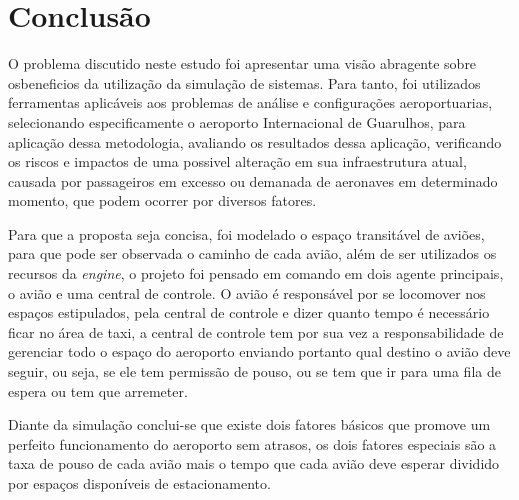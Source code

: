 \documentclass[12pt]{article}
\begin{document}
\section{Conclusão}

O problema discutido neste estudo foi apresentar uma visão abragente 
sobre osbeneficios da utilização da simulação de sistemas. Para tanto, foi 
utilizados ferramentas aplicáveis aos problemas de análise e configurações 
aeroportuarias, selecionando especificamente o aeroporto Internacional de
Guarulhos, para aplicação dessa metodologia, avaliando os resultados dessa
aplicação, verificando os riscos e impactos de uma possivel alteração em
sua infraestrutura atual, causada por passageiros em excesso ou demanada de 
aeronaves em determinado momento, que podem ocorrer por diversos fatores.

Para que a proposta seja concisa, foi modelado o espaço transitável  de aviões, 
para que pode ser observada o caminho de cada avião, além de ser utilizados os
recursos da \textit{engine}, o projeto foi pensado em comando em dois agente principais,
o avião e uma central de controle. O avião é responsável por se locomover nos espaços estipulados, 
pela central de controle e dizer quanto tempo é necessário ficar no área de taxi, a central
de controle tem por sua vez a responsabilidade de gerenciar todo o espaço do aeroporto enviando
portanto qual destino o avião deve seguir, ou seja, se ele tem permissão de pouso, ou se tem
que ir para uma fila de espera ou tem que arremeter.

Diante da simulação conclui-se que  existe dois fatores básicos que promove um perfeito
funcionamento do aeroporto sem atrasos, os dois fatores especiais são a taxa de pouso 
de cada avião mais o tempo que cada avião deve esperar dividido por espaços disponíveis
de estacionamento. 



\end{document}

